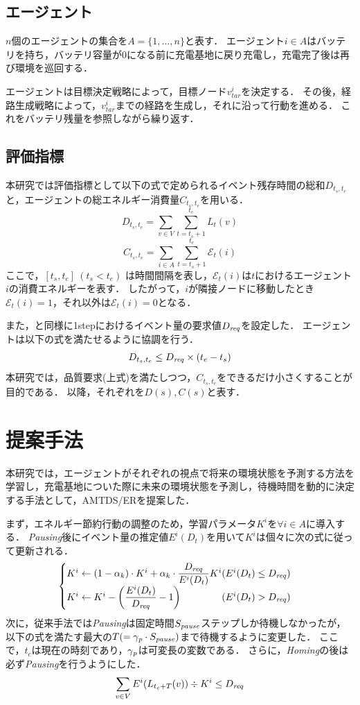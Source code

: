 \documentclass[11pt,a4j,twocolumn]{jarticle}
\def\AgentSet{A}
\def\Dreq{{D_{\it req}}}
\def\En{\mathcal{E}}
\def\PausingInt{{S_{\it pause}}}
\def\PauseTimeFactor{{\gamma_{\it p}}}
\begin{document}
\subsection{エージェント}
$n$個のエージェントの集合を$\AgentSet=\{1,\dots ,n\}$と表す．
エージェント$i\in\AgentSet$はバッテリを持ち，バッテリ容量が0になる前に充電基地に戻り充電し，充電完了後は再び環境を巡回する．
\par

エージェントは目標決定戦略によって，目標ノード$v^i_{tar}$を決定する．
その後，経路生成戦略によって，$v^i_{tar}$までの経路を生成し，それに沿って行動を進める．
これをバッテリ残量を参照しながら繰り返す．

\subsection{評価指標}
本研究では評価指標として以下の式で定められるイベント残存時間の総和$D_{t_s,t_e}$と，エージェントの総エネルギー消費量$C_{t_s,t_e}$を用いる．
%
\[
  D_{t_s,t_e} = \sum_{v \in V} \sum^{t_e}_{t=t_s+1} L_t(v)
\]
%
\[
  C_{t_s,t_e} = \sum_{i \in \AgentSet} \sum^{t_e}_{t=t_s+1} \En_t(i)
\]
%
ここで，$[t_s,t_e]~(t_s < t_e)$ は時間間隔を表し，$\En_t(i)$は$t$におけるエージェント$i$の消費エネルギーを表す．
したがって，$i$が隣接ノードに移動したとき$\En_t(i)=1$，それ以外は$\En_t(i)=0$となる．
\par
また，\cite{Wu2019}と同様に1stepにおけるイベント量の要求値$\Dreq$を設定した．
エージェントは以下の式を満たせるように協調を行う．
%
\[
  D_{t_s,t_e}\leq \Dreq \times (t_e - t_s)
\]
%
本研究では，品質要求(上式)を満たしつつ，$C_{t_s, t_e}$をできるだけ小さくすることが目的である．
以降，それぞれを$D(s), C(s)$と表す．


\section{提案手法}
本研究では，エージェントがそれぞれの視点で将来の環境状態を予測する方法を学習し，充電基地についた際に未来の環境状態を予測し，待機時間を動的に決定する手法として，AMTDS/ERを提案した．
\par

まず，エネルギー節約行動の調整のため，学習パラメータ$K^i$を$\forall i\in \AgentSet$に導入する．
{\em Pausing}後にイベント量の推定値$E^i(D_t)$を用いて$K^i$は個々に次の式に従って更新される．
%
\[
  \begin{cases}
    K^i \gets (1 - \alpha_k) \cdot K^i + \alpha_k \cdot \dfrac{\Dreq}{E^i(D_t)}K^i 
    \hfill (E^i(D_t) \leq \Dreq)\\
    K^i \gets K^i - \left( \dfrac{E^i(D_t)}{\Dreq} - 1 \right) 
    \hfill (E^i(D_t) > \Dreq)
  \end{cases}
\]
%
次に，従来手法では{\em Pausing}は固定時間$\PausingInt$ステップしか待機しなかったが，以下の式を満たす最大の$T (= \PauseTimeFactor\cdot\PausingInt)$まで待機するように変更した．
ここで，$t_c$は現在の時刻であり，$\PauseTimeFactor$は可変長の変数である．
さらに，{\em Homing}の後は必ず{\em Pausing}を行うようにした．
% 
\[
 \sum_{v \in V} E^i(L_{t_c+T}(v)) \div K^i \leq \Dreq
\] 
%
\end{document}
